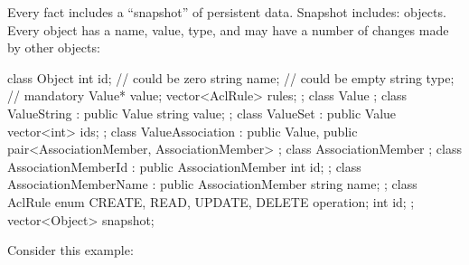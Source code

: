 \documentclass[12pt,oneside,letterpaper]{article}
\begin{document}

Every fact includes a ``snapshot'' of persistent data. Snapshot includes:
objects. Every object
has a name, value, type,
and may have a number of changes made by other objects:

\begin{ffcode}
class Object {
  int id; // could be zero
  string name; // could be empty
  string type; // mandatory
  Value* value;
  vector<AclRule> rules;
};
class Value {};
class ValueString : public Value {
  string value;
};
class ValueSet : public Value {
  vector<int> ids;
};
class ValueAssociation : public Value,
  public pair<AssociationMember, AssociationMember> {};
class AssociationMember {};
class AssociationMemberId : public AssociationMember {
  int id;
};
class AssociationMemberName : public AssociationMember {
  string name;
};
class AclRule {
  enum {CREATE, READ, UPDATE, DELETE} operation;
  int id;
};
vector<Object> snapshot;
\end{ffcode}

Consider this example:
\end{document}
